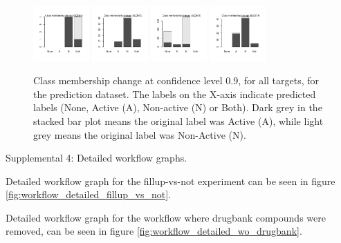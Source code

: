 \documentclass[10pt,article]{memoir}
\begin{document}
\begin{figure}[h!]
\includegraphics[width=0.19\textwidth]{figures/validation_plots/scn5a_0p9_valplot.pdf}
\includegraphics[width=0.19\textwidth]{figures/validation_plots/slc6a2_0p9_valplot.pdf}
\includegraphics[width=0.19\textwidth]{figures/validation_plots/slc6a3_0p9_valplot.pdf}
\includegraphics[width=0.19\textwidth]{figures/validation_plots/slc6a4_0p9_valplot.pdf}
    \caption{Class membership change at confidence level 0.9, for all targets,
    for the prediction dataset.
    The labels on the X-axis indicate predicted labels (None, Active (A),
    Non-active (N) or Both). Dark grey in the stacked bar plot means the
    original label was Active (A), while light grey means the original label
    was Non-Active (N).
    }
    \label{fig:validation_plots_all_0.9}
\end{figure}

Supplemental 4: Detailed workflow graphs.

Detailed workflow graph for the fillup-vs-not experiment can be seen in figure
\ref{fig:workflow_detailed_fillup_vs_not}.

Detailed workflow graph for the workflow where drugbank compounds were removed,
can be seen in figure \ref{fig:workflow_detailed_wo_drugbank}.
\end{document}
